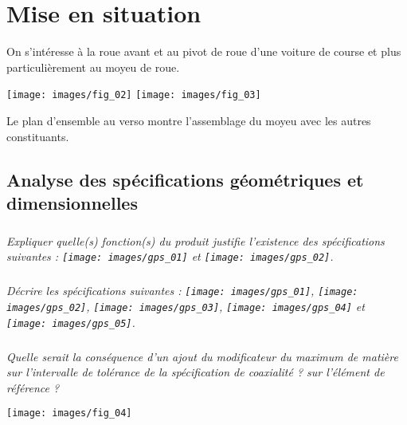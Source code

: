 \documentclass[10pt,fleqn]{article} %
\begin{document}

\vspace{4cm}
\pagestyle{fancy}
\thispagestyle{plain}


\def\columnseprulecolor{\color{ocre}}
\setlength{\columnseprule}{0.4pt} 

\section*{Mise en situation}
\ifprof
\else
\fi

On s'intéresse à la roue avant et au pivot de roue d'une voiture de course et plus particulièrement au moyeu de roue.

\begin{center}
\texttt{[image: images/fig\_02]}
\texttt{[image: images/fig\_03]}
\end{center}

Le plan d'ensemble au verso montre l'assemblage du moyeu avec les autres constituants. 

\subsection*{Analyse des spécifications géométriques et dimensionnelles}

\begin{minipage}[c]{.6\linewidth}
\subparagraph{}
\textit{Expliquer quelle(s) fonction(s) du produit justifie l'existence des spécifications suivantes :
\texttt{[image: images/gps\_01]} et \texttt{[image: images/gps\_02]}.}


\subparagraph{}
\textit{Décrire les spécifications suivantes :
\texttt{[image: images/gps\_01]}, \texttt{[image: images/gps\_02]}, \texttt{[image: images/gps\_03]}, \texttt{[image: images/gps\_04]} et \texttt{[image: images/gps\_05]}.}

\subparagraph{}
\textit{Quelle serait la conséquence d'un ajout du modificateur du maximum de matière sur l'intervalle de tolérance de la spécification de coaxialité ? sur l'élément de référence ?}

\end{minipage} \hfill
\begin{minipage}[c]{.38\linewidth}

\begin{center}
\texttt{[image: images/fig\_04]}
\end{center}
\end{minipage}
\end{document}
